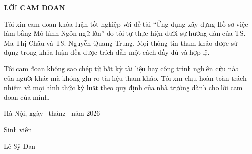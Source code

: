 \documentclass[../DoAn.tex]{subfiles}
\begin{document}
\begin{center}
{\bfseries \large LỜI CAM ĐOAN}
\end{center}

\vspace{0.5cm}

Tôi xin cam đoan khóa luận tốt nghiệp với đề tài ``Ứng dụng xây dựng Hồ sơ việc làm bằng Mô hình Ngôn ngữ lớn'' do tôi tự thực hiện dưới sự hướng dẫn của TS. Ma Thị Châu và TS. Nguyễn Quang Trung. Mọi thông tin tham khảo được sử dụng trong khóa luận đều được trích dẫn một cách đầy đủ và hợp lệ.

Tôi cam đoan không sao chép từ bất kỳ tài liệu hay công trình nghiên cứu nào của người khác mà không ghi rõ tài liệu tham khảo. Tôi xin chịu hoàn toàn trách nhiệm và mọi hình thức kỷ luật theo quy định của nhà trường dành cho lời cam đoan của mình.

\vspace{1.5cm}

\begin{flushright}
Hà Nội, ngày \dotfill\ tháng \dotfill\ năm 2026

\vspace{0.8cm}

Sinh viên

\vspace{1.2cm}

Lê Sỹ Đan
\end{flushright}
\end{document}
